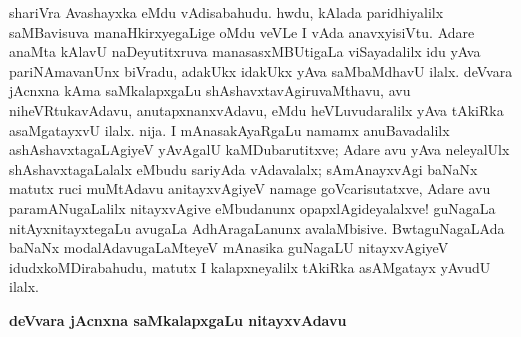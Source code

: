 shariVra Avashayxka eMdu vAdisabahudu. hwdu, kAlada paridhiyalilx saMBavisuva manaHkirxyegaLige oMdu veVLe I vAda anavxyisiVtu. Adare anaMta kAlavU naDeyutitxruva manasasxMBUtigaLa viSayadalilx idu yAva pariNAmavanUnx biVradu, adakUkx idakUkx yAva saMbaMdhavU ilalx. deVvara jAcnxna kAma saMkalapxgaLu shAshavxtavAgiruvaMthavu, avu niheVRtukavAdavu, anutapxnanxvAdavu, eMdu heVLuvudaralilx yAva tAkiRka asaMgatayxvU ilalx. nija. I mAnasakAyaRgaLu namamx anuBavadalilx ashAshavxtagaLAgiyeV yAvAgalU kaMDubarutitxve; Adare avu yAva neleyalUlx shAshavxtagaLalalx eMbudu sariyAda vAdavalalx; sAmAnayxvAgi baNaNx matutx ruci muMtAdavu anitayxvAgiyeV namage goVcarisutatxve, Adare avu paramANugaLalilx nitayxvAgive eMbudanunx opapxlAgideyalalxve! guNagaLa nitAyxnitayxtegaLu avugaLa AdhAragaLanunx avalaMbisive. BwtaguNagaLAda baNaNx modalAdavugaLaMteyeV mAnasika guNagaLU nitayxvAgiyeV idudxkoMDirabahudu, matutx I kalapxneyalilx tAkiRka asAMgatayx yAvudU ilalx.

\bigskip
\begin{center}
{\Large\bf deVvara jAcnxna saMkalapxgaLu nitayxvAdavu}
\end{center}

